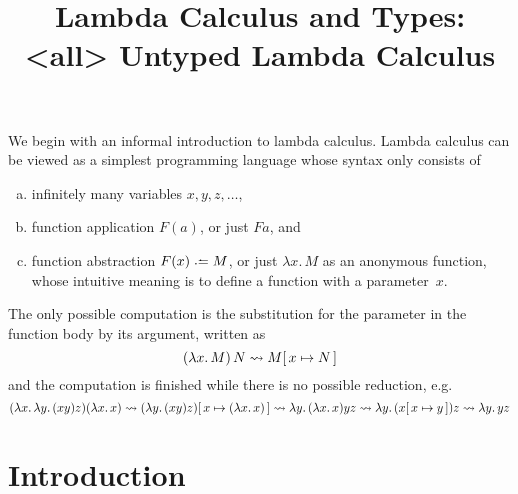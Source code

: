 \title{Lambda Calculus and Types:\\<all>
  Untyped Lambda Calculus}

\begin{frame}
\maketitle
\end{frame}

We begin with an informal introduction to lambda calculus. Lambda calculus can
be viewed as a simplest programming language whose syntax only consists of
\begin{enumerate}[(a)]
  \item infinitely many variables $x, y, z, \ldots$, 
  \item function application $F(a)$, or just $F a$, and
  \item function abstraction $F(x) \defeq M$, or just $\lambda x.\, M$
    as an anonymous function, whose intuitive meaning is to define a function
    with a parameter~$x$.
\end{enumerate}
The only possible computation is the substitution for the parameter in the
function body by its argument, written as 
\[
  (\lambda x.\, M)\, N \leadsto M[\,x\mapsto N\,]
\]
and the computation is finished while there is no possible reduction, e.g.
\[
  (\lambda x.\, \lambda y.\, (x y) z) (\lambda x.\, x)
  \leadsto (\lambda y.\, (x y) z)[\,x\mapsto(\lambda x.\, x)\,]
  \leadsto \lambda y.\, (\lambda x.\, x) y z
  \leadsto \lambda y.\, (x[\,x\mapsto y\,]) z
  \leadsto \lambda y.\, y z
\]

\section{Introduction}

